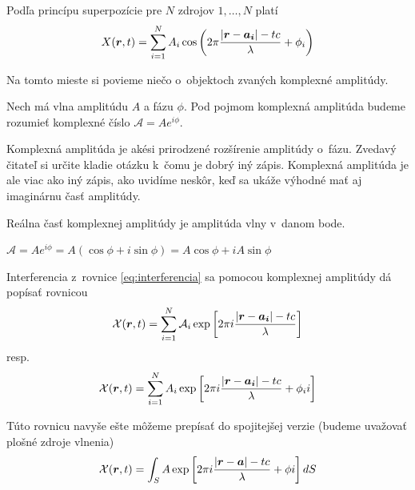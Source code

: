 Podľa princípu superpozície pre $N$ zdrojov $1,\dots,N$ platí
\begin{equation}
X(\boldsymbol{r},t)=\sum_{i=1}^{N} A_i \cos \left(2 \pi
\frac{|\boldsymbol{r}-\boldsymbol{a_i}| - t c}{\lambda}+\phi_i \right)
\label{eq:interferencia}
\end{equation}

Na tomto mieste si povieme niečo o~objektoch zvaných komplexné
amplitúdy.

\begin{definicia}
Nech má vlna amplitúdu $A$ a fázu $\phi$.
Pod pojmom komplexná amplitúda budeme rozumieť komplexné číslo
$\mathcal{A}=A e^{i \phi}$.
\end{definicia}

\begin{poznamka}
 Komplexná amplitúda je akési prirodzené rozšírenie amplitúdy 
 o~fázu. Zvedavý čitateľ si určite kladie otázku k~čomu je dobrý iný
 zápis. Komplexná amplitúda je ale viac ako iný zápis, ako uvidíme
 neskôr, keď sa ukáže výhodné mať aj imaginárnu časť amplitúdy.
\end{poznamka}


\begin{lema}
Reálna časť komplexnej amplitúdy je amplitúda vlny v~danom bode.
\end{lema}
\begin{dokaz}
$\mathcal{A}=A e^{i \phi} = A (\cos \phi + i \sin \phi) =
A \cos \phi + i A \sin \phi$
\end{dokaz}

\begin{lema}
Interferencia z~rovnice \ref{eq:interferencia} sa pomocou
komplexnej amplitúdy dá popísať rovnicou
\begin{equation}
\mathcal{X}(\boldsymbol{r},t)=\sum_{i=1}^{N} 
\mathcal{A}_i \exp \left[2 \pi i \frac{|\boldsymbol{r}-\boldsymbol{a_i}|
-tc}{\lambda}  \right]
\end{equation} 
resp.
\begin{equation}
\mathcal{X}(\boldsymbol{r},t)=\sum_{i=1}^{N} 
A_i 
\exp \left[2 \pi i
\frac{|\boldsymbol{r}-\boldsymbol{a_i}| - t c}{\lambda}+ \phi_i i \right]
\end{equation}
\end{lema}

Túto rovnicu navyše ešte môžeme prepísať do spojitejšej verzie (budeme
uvažovať plošné zdroje vlnenia)
\begin{equation}
\mathcal{X}(\boldsymbol{r},t)=\int_S
 A \exp \left[2 \pi i \frac{|\boldsymbol{r}-\boldsymbol{a}|
 -tc}{\lambda}+\phi i \right] dS
\end{equation}

